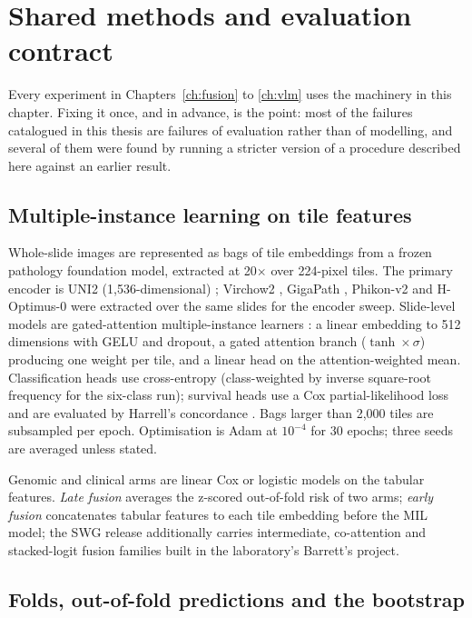 \chapter{Shared methods and evaluation contract}
\label{ch:methods}

Every experiment in Chapters~\ref{ch:fusion} to \ref{ch:vlm} uses the machinery in this chapter. Fixing it once, and in advance, is the point: most of the failures catalogued in this thesis are failures of evaluation rather than of modelling, and several of them were found by running a stricter version of a procedure described here against an earlier result.

\section{Multiple-instance learning on tile features}

Whole-slide images are represented as bags of tile embeddings from a frozen pathology foundation model, extracted at 20$\times$ over 224-pixel tiles. The primary encoder is UNI2 (1,536-dimensional) \citep{chen2024uni}; Virchow2 \citep{vorontsov2024virchow}, GigaPath \citep{xu2024gigapath}, Phikon-v2 \citep{filiot2023phikon} and H-Optimus-0 \citep{saillard2024hoptimus} were extracted over the same slides for the encoder sweep. Slide-level models are gated-attention multiple-instance learners \citep{ilse2018abmil, lu2021clam}: a linear embedding to 512 dimensions with GELU and dropout, a gated attention branch ($\tanh \times \sigma$) producing one weight per tile, and a linear head on the attention-weighted mean. Classification heads use cross-entropy (class-weighted by inverse square-root frequency for the six-class run); survival heads use a Cox partial-likelihood loss and are evaluated by Harrell's concordance \citep{harrell1982}. Bags larger than 2,000 tiles are subsampled per epoch. Optimisation is Adam at $10^{-4}$ for 30 epochs; three seeds are averaged unless stated.

Genomic and clinical arms are linear Cox or logistic models on the tabular features. \emph{Late fusion} averages the z-scored out-of-fold risk of two arms; \emph{early fusion} concatenates tabular features to each tile embedding before the MIL model; the SWG release additionally carries intermediate, co-attention and stacked-logit fusion families built in the laboratory's Barrett's project.

\section{Folds, out-of-fold predictions and the bootstrap}
\label{sec:folds}

